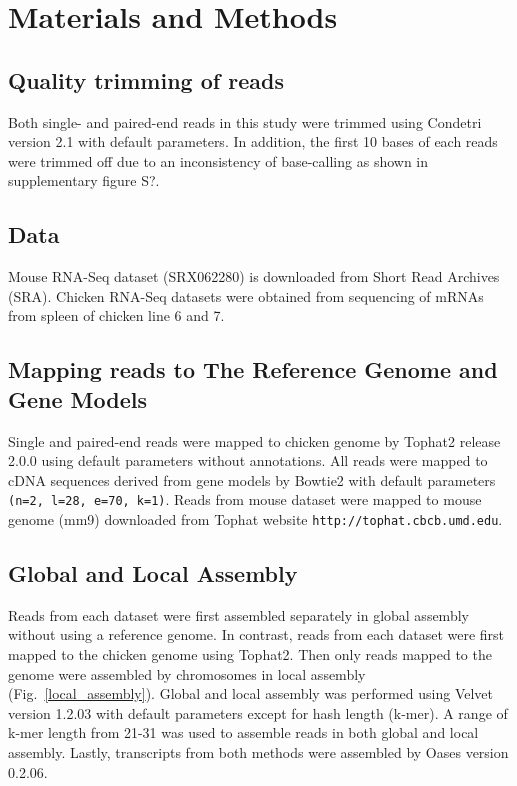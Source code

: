 \documentclass[10pt]{article}
\begin{document}
\section*{Materials and Methods}

\subsection*{Quality trimming of reads}
Both single- and paired-end reads in this study were trimmed using Condetri version 2.1 with default parameters.
In addition, the first 10 bases of each reads were trimmed off due to an inconsistency of base-calling as shown in supplementary figure S?.

\subsection*{Data}
Mouse RNA-Seq dataset (SRX062280) is downloaded from Short Read Archives (SRA).
Chicken RNA-Seq datasets were obtained from sequencing of mRNAs from spleen of chicken line 6 and 7.

\subsection*{Mapping reads to The Reference Genome and Gene Models}

Single and paired-end reads were mapped to chicken genome by Tophat2\cite{Trapnell:2009dp} release 2.0.0 using
default parameters without annotations.
All reads were mapped to cDNA sequences derived from gene models by Bowtie2\cite{Langmead:2009fv} with
default parameters \texttt{(n=2, l=28, e=70, k=1)}.
Reads from mouse dataset were mapped to mouse genome (mm9) downloaded from Tophat website \texttt{http://tophat.cbcb.umd.edu}.

\subsection*{Global and Local Assembly}

Reads from each dataset were first assembled separately in global assembly without using a reference genome.
In contrast, reads from each dataset were first mapped to the chicken genome using Tophat2.
Then only reads mapped to the genome were assembled by chromosomes in local assembly (Fig.~\ref{local_assembly}).
Global and local assembly was performed using Velvet version 1.2.03\cite{Zerbino:2008vu}
with default parameters except for hash length (k-mer).
A range of k-mer length from 21-31 was used to assemble reads in both global and local assembly.
Lastly, transcripts from both methods were assembled by Oases version 0.2.06\cite{Schulz:2012je}.
\end{document}
